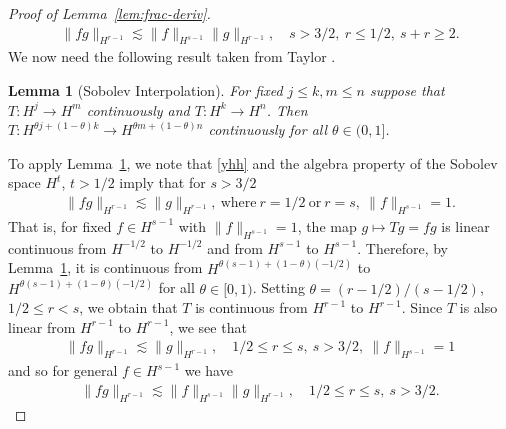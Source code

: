 \documentclass[12pt,reqno]{amsart}
\numberwithin{equation}{section}  %
\numberwithin{figure}{section}
\newtheorem{lemma}{Lemma}
\begin{document}
\begin{proof}[Proof of Lemma~\ref{lem:frac-deriv}]
\begin{equation}
\begin{split}
\| f g \|_{H^{r-1}} \lesssim \| f \|_{H^{s-1}} \| g \|_{H^{r-1}},
\quad s > 3/2, \ r \le 1/2, \ s + r \ge 2.
\end{split}
\end{equation}
We now need the following result taken from Taylor \cite{Taylor:2011zy}.
%
%
%
%
%                
%
%
%
%
\begin{lemma}[Sobolev Interpolation]
For fixed $j \le k, m \le n$ suppose that \\ $T: H^{j} \to H^{m}$ continuously
and $T: H^{k} \to H^{n}$. Then\\ $T: H^{\theta j + (1 - \theta)k} \to H^{\theta
m + (1 - \theta) n}$ continuously for all $\theta \in (0,1]$.
\label{prop:sob-interp}
\end{lemma}
%
To apply Lemma~\ref{prop:sob-interp}, we note that \eqref{yhh}
and the algebra property of the Sobolev space $H^{t}$, $t > 1/2$ imply that for $s > 3/2$
%
%
\begin{equation*}
\begin{split}
\| f g \|_{H^{r-1}} \lesssim \| g \|_{H^{r-1}}, \  \text{where} \ 
r=1/2 \ \text{or} \  r =s, \ \| f \|_{H^{s-1}} =1.
\end{split}
\end{equation*}
%
%
That is, for fixed $f \in H^{s-1}$ with $\| f \|_{H^{s-1}} =1$, the map $g \mapsto
Tg = fg$ is linear continuous from $H^{-1/2}$ to $H^{-1/2}$ and from $H^{s-1}$ to
$H^{s-1}$. Therefore, by Lemma~\ref{prop:sob-interp}, it is continuous from
$H^{\theta (s-1) + (1 - \theta)(-1/2) }$ to $H^{\theta (s-1) + (1 - \theta)(-1/2) }$ for all $\theta \in
[0, 1)$. Setting $\theta = (r-1/2)/(s-1/2)$, $ 1/2 \le r < s$, we obtain that $T$ is
continuous from $H^{r-1}$ to $H^{r-1}$. Since $T$ is also linear from $H^{r-1}$
to $H^{r-1}$, we see that 
%
%
\begin{equation*}
\begin{split}
\| f g \|_{H^{r-1}} \lesssim \| g \|_{H^{r-1}}, \quad 1/2 \le r \le s, \ s > 3/2, \ \| f \|_{H^{s-1}} =1
\end{split}
\end{equation*}
and so for general $f \in H^{s-1}$ we have 
%
\begin{equation}
\label{hhh}
\begin{split}
\| f g \|_{H^{r-1}} \lesssim \|f \|_{H^{s-1}}
\| g \|_{H^{r-1}}, \quad 1/2 \le r \le s, \ s > 3/2. 
\end{split}
\end{equation}

\end{proof}
\end{document}
